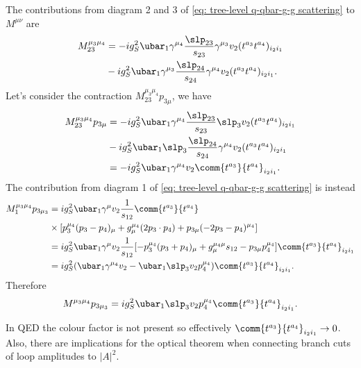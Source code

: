 The contributions from diagram 2 and 3 of \eqref{eq: tree-level q-qbar-g-g scattering} to $M^{\mu\nu}$ are 
\begin{equation}
    \begin{split}
        M^{\mu_3\mu_4}_{23} &= -ig_S^2\ubar_1\gamma^{\mu_4}\frac{\slp_{23}}{s_{23}}\gamma^{\mu_3}v_2(t^{a_3}t^{a_4})_{i_2i_1} \\
        &- ig_S^2\ubar_1\gamma^{\mu_3}\frac{\slp_{24}}{s_{24}}\gamma^{\mu_4}v_2(t^{a_3}t^{a_4})_{i_2i_1}.
    \end{split}
\end{equation}
Let's consider the contraction $M^{\mu_3\mu_4}_{23}p_{3\mu}$, we have
\begin{equation}
    \begin{split}
        M^{\mu_3\mu_4}_{23}p_{3\mu} &= -ig_S^2\ubar_1\gamma^{\mu_4}\frac{\slp_{23}}{s_{23}}\slp_3v_2(t^{a_3}t^{a_4})_{i_2i_1} \\
        &- ig_S^2\ubar_1\slp_3\frac{\slp_{24}}{s_{24}}\gamma^{\mu_4}v_2(t^{a_3}t^{a_4})_{i_2i_1} \\
        &= -ig_S^2\ubar_1\gamma^{\mu_4}v_2\comm{t^{a_3}}{t^{a_4}}_{i_2i_1}.
    \end{split}
\end{equation}
The contribution from diagram 1 of \eqref{eq: tree-level q-qbar-g-g scattering} is instead
\begin{equation}
    \begin{split}
        M^{\mu_3\mu_4}_1p_{3\mu_3} &= ig_S^2\ubar_1\gamma^\mu v_2\frac{1}{s_{12}}\comm{t^{a_3}}{t^{a_4}} \\
        &\times [p_3^{\mu_4}(p_3 - p_4)_\mu + g^{\mu_4}_\mu(2p_3 \cdot p_4) + p_{3\mu}(-2p_3 - p_4)^{\mu_4}] \\
        &= ig_S^2\ubar_1\gamma^\mu v_2\frac{1}{s_{12}}[-p_3^{\mu_4}(p_3 + p_4)_\mu + g^{\mu_4\mu}_\mu s_{12} - p_{3\mu}p_4^{\mu_4}]\comm{t^{a_3}}{t^{a_4}}_{i_2i_1} \\
        &= ig_S^2(\ubar_1\gamma^{\mu_4}v_2 - \ubar_1\slp_3v_2p_4^{\mu_4})\comm{t^{a_3}}{t^{a_4}}_{i_2i_1}.
    \end{split}
\end{equation}
Therefore
\begin{equation}
    M^{\mu_3\mu_4}p_{3\mu_3} = ig_S^2\ubar_1\slp_3v_2p_4^{\mu_4}\comm{t^{a_3}}{t^{a_4}}_{i_2i_1}.
\end{equation}
\begin{obs}
    In QED the colour factor is not present so effectively $\comm{t^{a_3}}{t^{a_4}}_{i_2i_1} \to 0$. Also, there are implications for the optical theorem when connecting branch cuts of loop amplitudes to $|A|^2$. 
\end{obs}
